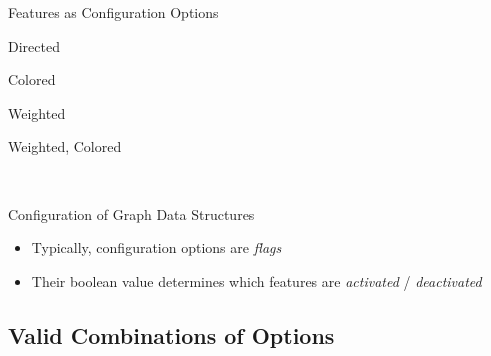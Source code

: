 \begin{frame}{Features as Configuration Options}
	\begin{fancycolumns}[columns=3,widths={25,25},animation=none]
		\begin{exampletight}{Directed}
		\end{exampletight}
		\begin{exampletight}{Colored}
		\end{exampletight}
	\nextcolumn
		\begin{exampletight}{Weighted}
		\end{exampletight}
		\begin{exampletight}{Weighted, Colored}
		\end{exampletight}
	\nextcolumn
		\pause{}
		\hfill
		
		~\pause
		
		\begin{note}{Configuration of Graph Data Structures}
			\begin{itemize}
				\item Typically, configuration options are \emph{flags}
				\item Their boolean value determines which features are \emph{activated} / \emph{deactivated}
			\end{itemize}
		\end{note}
	\end{fancycolumns}
\end{frame}

\subsection{Valid Combinations of Options}

